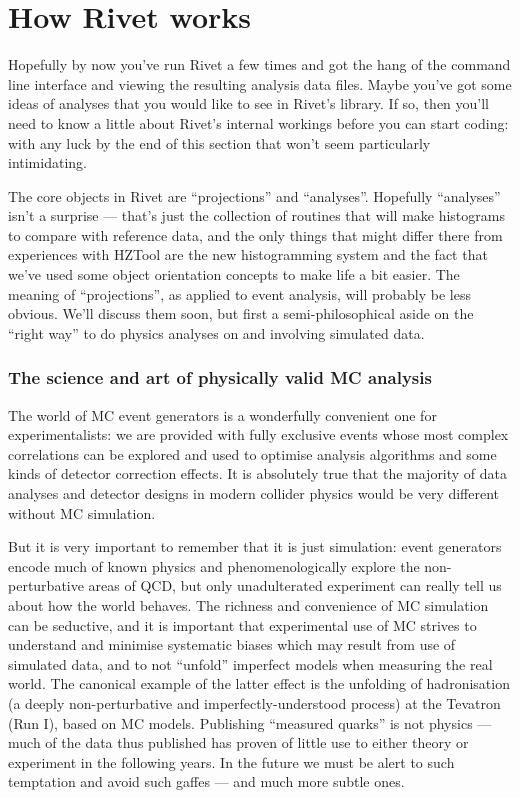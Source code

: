 \documentclass{JHEP3}
\begin{document}




\cleardoublepage
\part{How Rivet works}
\label{part:writinganalyses}

Hopefully by now you've run Rivet a few times and got the hang of the command
line interface and viewing the resulting analysis data files. Maybe you've got
some ideas of analyses that you would like to see in Rivet's library. If so,
then you'll need to know a little about Rivet's internal workings before you can
start coding: with any luck by the end of this section that won't seem
particularly intimidating.

The core objects in Rivet are ``projections'' and ``analyses''. Hopefully
``analyses'' isn't a surprise --- that's just the collection of routines that
will make histograms to compare with reference data, and the only things that
might differ there from experiences with HZTool\cite{Bromley:1995np} are the new histogramming system
and the fact that we've used some object orientation concepts to make life a bit
easier. The meaning of ``projections'', as applied to event analysis, will
probably be less obvious. We'll discuss them soon, but first a
semi-philosophical aside on the ``right way'' to do physics analyses on and
involving simulated data.


\section{The science and art of physically valid MC analysis}

The world of MC event generators is a wonderfully convenient one for
experimentalists: we are provided with fully exclusive events whose most complex
correlations can be explored and used to optimise analysis algorithms and some
kinds of detector correction effects. It is absolutely true that the majority of
data analyses and detector designs in modern collider physics would be very
different without MC simulation.

But it is very important to remember that it is just simulation: event
generators encode much of known physics and phenomenologically explore the
non-perturbative areas of QCD, but only unadulterated experiment can really tell
us about how the world behaves. The richness and convenience of MC simulation
can be seductive, and it is important that experimental use of MC strives to
understand and minimise systematic biases which may result from use of simulated
data, and to not ``unfold'' imperfect models when measuring the real world. The
canonical example of the latter effect is the unfolding of hadronisation (a
deeply non-perturbative and imperfectly-understood process) at the Tevatron (Run
I), based on MC models. Publishing ``measured quarks'' is not physics --- much
of the data thus published has proven of little use to either theory or
experiment in the following years. In the future we must be alert to such
temptation and avoid such gaffes --- and much more subtle ones.
\end{document}
